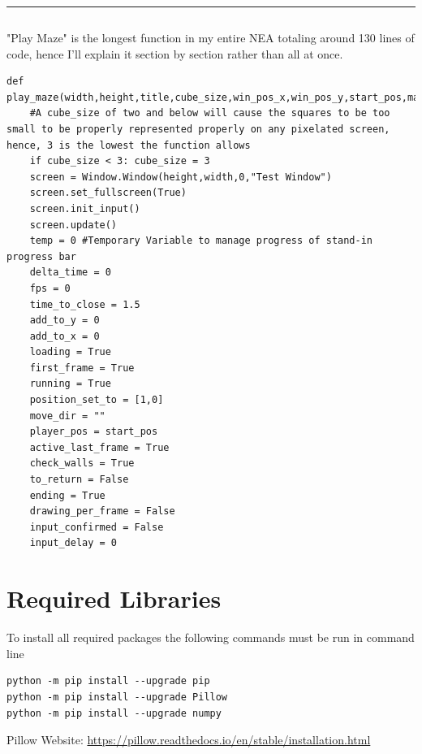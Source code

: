 \documentclass{article}
\begin{document}
\textcolor[RGB]{220,220,220}{\rule{\linewidth}{0.2pt}}
\begin{lstlisting}
\end{lstlisting}
"Play Maze" is the longest function in my entire NEA totaling around 130 lines of code, hence I'll explain it section by section rather than all at once.
\begin{lstlisting}
def play_maze(width,height,title,cube_size,win_pos_x,win_pos_y,start_pos,maze_data):
    #A cube_size of two and below will cause the squares to be too small to be properly represented properly on any pixelated screen, hence, 3 is the lowest the function allows
    if cube_size < 3: cube_size = 3 
    screen = Window.Window(height,width,0,"Test Window")
    screen.set_fullscreen(True)
    screen.init_input()
    screen.update()
    temp = 0 #Temporary Variable to manage progress of stand-in progress bar
    delta_time = 0
    fps = 0
    time_to_close = 1.5
    add_to_y = 0
    add_to_x = 0
    loading = True
    first_frame = True
    running = True
    position_set_to = [1,0]
    move_dir = ""
    player_pos = start_pos
    active_last_frame = True
    check_walls = True
    to_return = False
    ending = True
    drawing_per_frame = False
    input_confirmed = False
    input_delay = 0
\end{lstlisting}



\clearpage
\section{Required Libraries}
To install all required packages the following commands must be run in command line                      
\begin{lstlisting}
python -m pip install --upgrade pip
python -m pip install --upgrade Pillow
python -m pip install --upgrade numpy
\end{lstlisting}
Pillow Website: \url{https://pillow.readthedocs.io/en/stable/installation.html}
\end{document}
